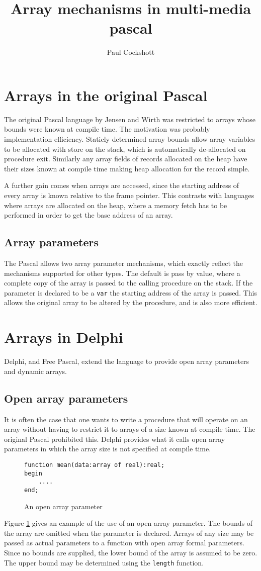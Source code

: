 \title{Array mechanisms in multi-media pascal}
\author{Paul Cockshott}

\section*{Arrays in the original Pascal}
The original Pascal language by Jensen and Wirth was restricted
to arrays whose bounds were known at compile time.
The motivation was probably implementation efficiency.
Staticly determined array bounds allow array variables to be
allocated with store on the stack, which is automatically
de-allocated on procedure exit.
Similarly any array fields of records allocated on the
heap have their sizes known at compile time making heap
allocation for the record simple. 

A further gain comes 
when arrays are accessed, since the starting address of
every array is known relative to the frame pointer.
This contrasts with languages where arrays are allocated
on the heap, where a memory fetch has to be performed
in order to get the base address of an array.
\subsection*{Array parameters}
The Pascal allows two array parameter mechanisms, which 
exactly reflect the mechanisms supported for other types.
The default is pass by value, where a complete copy of
the array is passed to the calling procedure on the stack.
If the parameter is declared to be a {\tt var} the
starting address of the array is passed. This allows
the original array to be altered by the procedure,
and is also more efficient.  

\section*{Arrays in Delphi}
Delphi, and Free Pascal, extend the language to
provide open array parameters and dynamic arrays.
\subsection*{Open array parameters}
It is often the case that one wants to write
a procedure that will operate on an array without
having to restrict it to arrays of a size known
at compile time. The original Pascal prohibited
this. Delphi provides what it calls open array parameters
in which the array size is not specified at compile time.
\begin{figure}
\begin{verbatim}
function mean(data:array of real):real;
begin
	....
end;
\end{verbatim}
\caption{An open array parameter}\label{mean}
\end{figure}
Figure \ref{mean} gives an example of the use of an open
array parameter. The bounds of the array are omitted
when the parameter is declared.
Arrays of any size may be passed as actual parameters
to a function with open array formal parameters.
Since no bounds are supplied, the 
 lower bound of the array is assumed to be zero. The
upper bound may be determined using the {\tt length} function.

